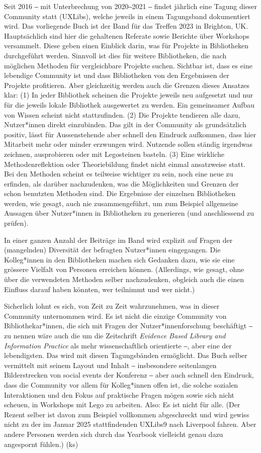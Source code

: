 \documentclass[a4paper,
fontsize=11pt,
oneside,
numbers=noperiodatend,
parskip=half-,
bibliography=totoc,
final
]{scrartcl}
\begin{document}
Seit 2016 ‒ mit Unterbrechung von 2020‒2021 ‒ findet jährlich eine
Tagung dieser Community statt (UXLibs), welche jeweils in einem
Tagungsband dokumentiert wird. Das vorliegende Buch ist der Band für das
Treffen 2023 in Brighton, UK. Hauptsächlich sind hier die gehaltenen
Referate sowie Berichte über Workshops versammelt. Diese geben einen
Einblick darin, was für Projekte in Bibliotheken durchgeführt werden.
Sinnvoll ist dies für weitere Bibliotheken, die nach möglichen Methoden
für vergleichbare Projekte suchen. Sichtbar ist, dass es eine lebendige
Community ist und dass Bibliotheken von den Ergebnissen der Projekte
profitieren. Aber gleichzeitig werden auch die Grenzen dieses Ansatzes
klar: (1) In jeder Bibliothek scheinen die Projekte jeweils neu
aufgesetzt und nur für die jeweils lokale Bibliothek ausgewertet zu
werden. Ein gemeinsamer Aufbau von Wissen scheint nicht stattzufinden.
(2) Die Projekte tendieren alle dazu, Nutzer*innen direkt einzubinden.
Das gilt in der Community als grundsätzlich positiv, lässt für
Aussenstehende aber schnell den Eindruck aufkommen, dass hier Mitarbeit
mehr oder minder erzwungen wird. Nutzende sollen ständig irgendwas
zeichnen, ausprobieren oder mit Legosteinen basteln. (3) Eine wirkliche
Methodenreflektion oder Theoriebildung findet nicht einmal ansatzweise
statt. Bei den Methoden scheint es teilweise wichtiger zu sein, noch
eine neue zu erfinden, als darüber nachzudenken, was die Möglichkeiten
und Grenzen der schon benutzten Methoden sind. Die Ergebnisse der
einzelnen Bibliotheken werden, wie gesagt, auch nie zusammengeführt, um
zum Beispiel allgemeine Aussagen über Nutzer*innen in Bibliotheken zu
generieren (und anschliessend zu prüfen).

In einer ganzen Anzahl der Beiträge im Band wird explizit auf Fragen der
(mangelnden) Diversität der befragten Nutzer*innen eingegangen. Die
Kolleg*innen in den Bibliotheken machen sich Gedanken dazu, wie sie eine
grössere Vielfalt von Personen erreichen können. (Allerdings, wie
gesagt, ohne über die verwendeten Methoden selber nachzudenken, obgleich
auch die einen Einfluss darauf haben könnten, wer teilnimmt und wer
nicht.)

Sicherlich lohnt es sich, von Zeit zu Zeit wahrzunehmen, was in dieser
Community unternommen wird. Es ist nicht die einzige Community von
Bibliothekar*innen, die sich mit Fragen der Nutzer*innenforschung
beschäftigt ‒ zu nennen wäre auch die um die Zeitschrift \emph{Evidence
Based Library and Information Practice} als mehr wissenschaftlich
orientierte ‒, aber eine der lebendigsten. Das wird mit diesen
Tagungsbänden ermöglicht. Das Buch selber vermittelt mit seinem Layout
und Inhalt ‒ insbesondere seitenlangen Bilderstrecken von social events
der Konferenz ‒ aber auch schnell den Eindruck, dass die Community vor
allem für Kolleg*innen offen ist, die solche sozialen Interaktionen und
den Fokus auf praktische Fragen mögen sowie sich nicht scheuen, in
Workshops mit Lego zu arbeiten. Also: Es ist nicht für alle. (Der Rezent
selber ist davon zum Beispiel vollkommen abgeschreckt und wird gewiss
nicht zu der im Januar 2025 stattfindenden UXLibs9 nach Liverpool
fahren. Aber andere Personen werden sich durch das Yearbook vielleicht
genau dazu angespornt fühlen.) (ks)
\end{document}
